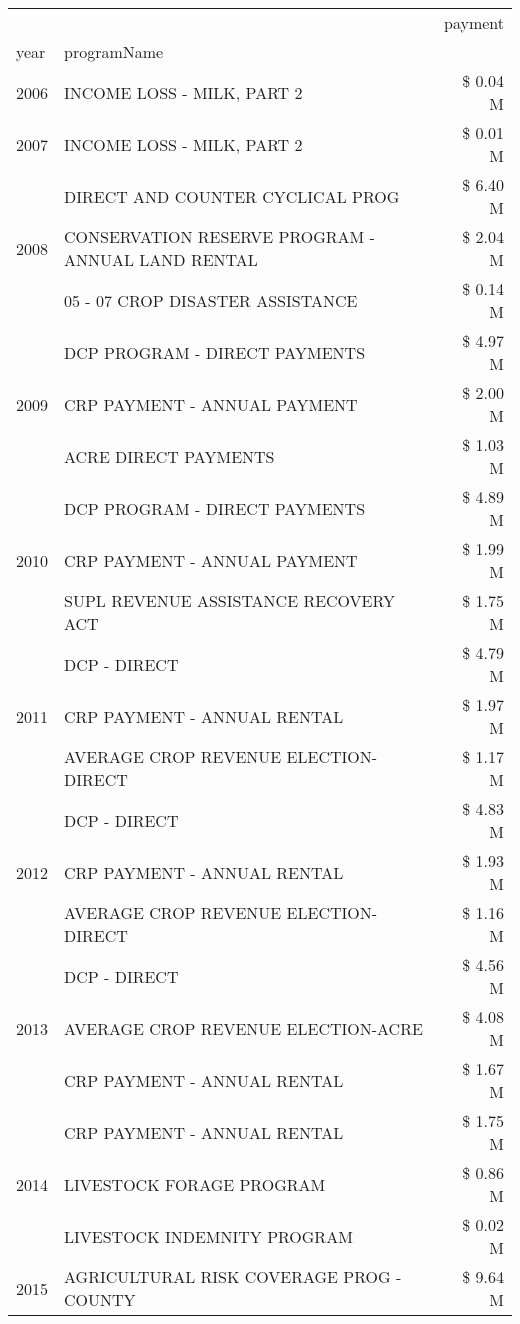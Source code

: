 \begin{tabular}{llr}
\toprule
 &  & payment \\
year & programName &  \\
\midrule
2006 & INCOME LOSS - MILK, PART 2 & \$ 0.04 M \\
\cline{1-3}
2007 & INCOME LOSS - MILK, PART 2 & \$ 0.01 M \\
\cline{1-3}
\multirow[t]{3}{*}{2008} & DIRECT AND COUNTER CYCLICAL PROG & \$ 6.40 M \\
 & CONSERVATION RESERVE PROGRAM - ANNUAL LAND RENTAL & \$ 2.04 M \\
 & 05 - 07 CROP DISASTER ASSISTANCE & \$ 0.14 M \\
\cline{1-3}
\multirow[t]{3}{*}{2009} & DCP PROGRAM - DIRECT PAYMENTS & \$ 4.97 M \\
 & CRP PAYMENT - ANNUAL PAYMENT & \$ 2.00 M \\
 & ACRE DIRECT PAYMENTS & \$ 1.03 M \\
\cline{1-3}
\multirow[t]{3}{*}{2010} & DCP PROGRAM - DIRECT PAYMENTS & \$ 4.89 M \\
 & CRP PAYMENT - ANNUAL PAYMENT & \$ 1.99 M \\
 & SUPL REVENUE ASSISTANCE RECOVERY ACT & \$ 1.75 M \\
\cline{1-3}
\multirow[t]{3}{*}{2011} & DCP - DIRECT & \$ 4.79 M \\
 & CRP PAYMENT - ANNUAL RENTAL & \$ 1.97 M \\
 & AVERAGE CROP REVENUE ELECTION-DIRECT & \$ 1.17 M \\
\cline{1-3}
\multirow[t]{3}{*}{2012} & DCP - DIRECT & \$ 4.83 M \\
 & CRP PAYMENT - ANNUAL RENTAL & \$ 1.93 M \\
 & AVERAGE CROP REVENUE ELECTION-DIRECT & \$ 1.16 M \\
\cline{1-3}
\multirow[t]{3}{*}{2013} & DCP - DIRECT & \$ 4.56 M \\
 & AVERAGE CROP REVENUE ELECTION-ACRE & \$ 4.08 M \\
 & CRP PAYMENT - ANNUAL RENTAL & \$ 1.67 M \\
\cline{1-3}
\multirow[t]{3}{*}{2014} & CRP PAYMENT - ANNUAL RENTAL & \$ 1.75 M \\
 & LIVESTOCK FORAGE PROGRAM & \$ 0.86 M \\
 & LIVESTOCK INDEMNITY PROGRAM & \$ 0.02 M \\
\cline{1-3}
\multirow[t]{3}{*}{2015} & AGRICULTURAL RISK COVERAGE PROG - COUNTY & \$ 9.64 M \\

\end{tabular}
